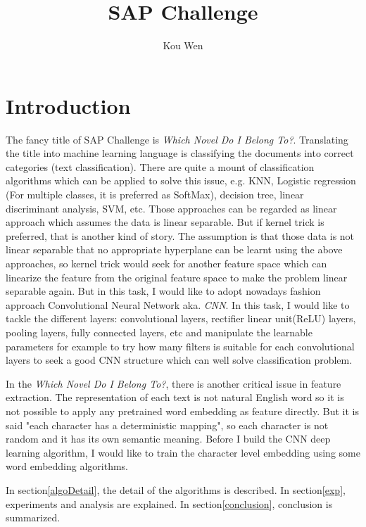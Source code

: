 \documentclass[a4paper]{article}
\title{SAP Challenge}
\author{Kou Wen}
\begin{document}
\maketitle

\section{Introduction}

The fancy title of SAP Challenge is \emph{Which Novel Do I Belong To?}. Translating the title into machine learning language is classifying the documents into correct categories (text classification). There are quite a mount of classification algorithms which can be applied to solve this issue, e.g. KNN, Logistic regression (For multiple classes, it is preferred as SoftMax), decision tree, linear discriminant analysis, SVM, etc. Those approaches can be regarded as linear approach which assumes the data is linear separable. But if kernel trick is preferred, that is another kind of story. The assumption is that those data is not linear separable that no appropriate hyperplane can be learnt using the above approaches, so kernel trick would seek for another feature space which can linearize the feature from the original feature space to make the problem linear separable again. But in this task, I would like to adopt nowadays fashion approach Convolutional Neural Network aka. \emph{CNN}. In this task, I would like to tackle the different layers: convolutional layers, rectifier linear unit(ReLU) layers, pooling layers, fully connected layers, etc and manipulate the learnable parameters for example to try how many filters is suitable for each convolutional layers to seek a good CNN structure which can well solve classification problem.

In the \emph{Which Novel Do I Belong To?}, there is another critical issue in feature extraction. The representation of each text is not natural English word so it is not possible to apply any pretrained word embedding as feature directly. But it is said "each character has a deterministic mapping", so each character is not random and it has its own semantic meaning. Before I build the CNN deep learning algorithm, I would like to train the character level embedding using some word embedding algorithms.

In section\ref{algoDetail}, the detail of the algorithms is described. In section\ref{exp}, experiments and analysis are explained. In section\ref{conclusion}, conclusion is summarized. 
\end{document}
